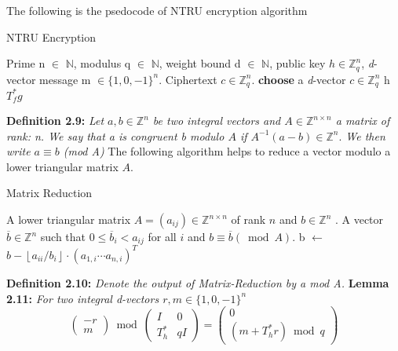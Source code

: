 The following is the psedocode of NTRU encryption algorithm\newline
\begin{algorithm}[h]
        \caption{NTRU Encryption}
        \begin{algorithmic}[1] %
            \Require Prime n $\in$ $\mathbb{N}$, modulus q $\in$ $\mathbb{N}$, weight bound d $\in$ $\mathbb{N}$, public key $h \in \mathbb{Z}_{q}^{n}$, \emph{d}-vector message m $\in\{1,0,-1\}^{n}$.
            \Ensure Ciphertext $c \in \mathbb{Z}_{q}^{n}$.
             \State \textbf{choose} a \emph{d}-vector $c \in \mathbb{Z}_{q}^{n}$
             \State h \leftarrow $T_{f}^{*} g$
             \State {}  
        \end{algorithmic}
    \end{algorithm} 
    \newline
    \newline
    \newpage
\textbf{Definition 2.9: } \emph{Let $a, b \in \mathbb{Z}^{n}$ be two integral vectors and $A \in \mathbb{Z}^{n \times n}$ a matrix of rank: n. We say that a is congruent b modulo $A$ if $A^{-1}(a-b) \in \mathbb{Z}^{n} .$ We then write $a \equiv b$ (mod A)}
\newline
\newline
The following algorithm helps to reduce a vector modulo a lower triangular matrix $A$. 
\begin{algorithm}[h]
        \caption{Matrix Reduction}
        \begin{algorithmic}[1] %
            \Require A lower triangular matrix $A=\left(a_{i j}\right) \in \mathbb{Z}^{n \times n}$ of rank $n$ and $b \in \mathbb{Z}^{n}$ .
            \Ensure A vector $\overline{b} \in \mathbb{Z}^{n}$ such that $0 \leq \overline{b}_{i}<a_{i j}$ for all $i$ and $b \equiv \overline{b}(\bmod A)$. 
                \State b $\leftarrow$ $b-\left\lfloor a_{i i} / b_{i}\right\rfloor \cdot\left(a_{1, i} \cdots a_{n, i}\right)^{T}$
             \EndFor
             \State {}  
        \end{algorithmic}
    \end{algorithm} 

\newline
\newline
\textbf{Definition 2.10: }\emph{Denote the output of Matrix-Reduction by a mod A.}
\newline
\newline
\textbf{Lemma 2.11: }\emph{For two integral d-vectors $r, m \in\{1,0,-1\}^{n}$
\begin{equation}
    \left(\begin{array}{c}{-r} \\ {m}\end{array}\right) \bmod \left(\begin{array}{cc}{I} & {0} \\ {T_{h}^{*}} & {q I}\end{array}\right)=\left(\begin{array}{c}{0} \\ {\left(m+T_{h}^{*} r\right) \bmod q}\end{array}\right)
\end{equation}
}
    

